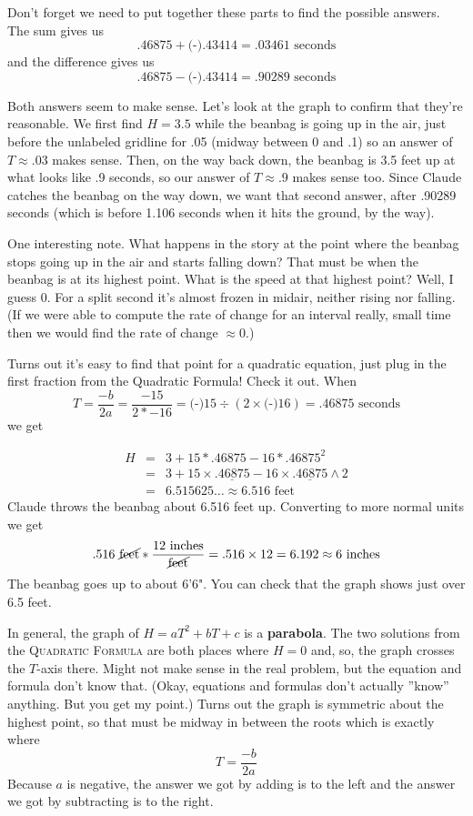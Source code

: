 Don't forget we need to put together these parts to find the possible answers.  The sum gives us $$.46875 +  \text{(-)}.43414 = .03461 \text{ seconds}$$ and the difference gives us $$.46875 -  \text{(-)}.43414 = .90289 \text{ seconds}$$  

Both answers seem to make sense.  Let's look at the graph to confirm that they're reasonable.  We first find $H=3.5$ while the beanbag is going up in the air, just before the unlabeled gridline for .05 (midway between 0 and .1) so an answer of $T\approx .03$ makes sense.  Then, on the way back down, the beanbag is 3.5 feet up at what looks like .9 seconds, so our answer of $T \approx .9$ makes sense too.   Since Claude catches the beanbag on the way down, we want that second answer, after .90289 seconds (which is before 1.106 seconds when it hits the ground, by the way).

One interesting note.  What happens in the story at the point where the beanbag stops going up in the air and starts falling down?  That must be when the beanbag is at its highest point.  What is the speed at that highest point?  Well, I guess 0.  For a split second it's almost frozen in midair, neither rising nor falling.  (If we were able to compute the rate of change for an interval really, small time then we would find the rate of change $\approx 0$.)

Turns out it's easy to find that point for a quadratic equation, just plug in the first fraction from the Quadratic Formula!  Check it out.  When 
$$T = \frac{-b}{2a} = \frac{-15}{2 \ast -16}=  \text{(-)}15 \div (2 \times  \text{(-)} 16)= .46875 \text{ seconds}$$
we get 
\vspace{-.25in} %

\begin{eqnarray*}
H &= &3 + 15 \ast .46875-16 \ast .46875^2 \\ 
& = & 3 + 15 \times \underline{.46875} - 16 \times \underline{.46875} \wedge 2 \\
& = &  6.515625\ldots \approx 6.516 \text{ feet}
\end{eqnarray*}
\noindent Claude throws the beanbag about 6.516 feet up.  Converting to more normal units we get $$.516 \text{ \cancel{feet}} \ast \frac{12 \text{ inches}}{\text{\cancel{feet}}} = .516 \times 12 = 6.192 \approx 6 \text{ inches}$$  The beanbag goes up to about 6'6".  You can check that the graph shows just over 6.5 feet.  

In general, the graph of $H = aT^2+bT+c$ is a \textbf{parabola}.  The two solutions from the \textsc{Quadratic Formula} are both places where $H=0$ and, so, the graph crosses the $T$-axis there.  Might not make sense in the real problem, but the equation and formula don't know that.  (Okay, equations and formulas don't actually ''know'' anything.  But you get my point.)  Turns out the graph is symmetric about the highest point, so that must be midway in between the roots which is exactly where $$T =\frac{-b}{2a}$$ Because $a$ is negative, the answer we got by adding is to the left and the answer we got by subtracting is to the right.

